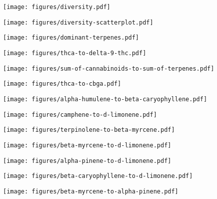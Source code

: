 \documentclass[../article.tex, 12pt]{subfiles}
\begin{document}
\begin{multicols}{2}
\vspace{1\baselineskip}

\texttt{[image: figures/diversity.pdf]}

\vspace{2\baselineskip}

\texttt{[image: figures/diversity-scatterplot.pdf]}

\vspace{2\baselineskip}

{\tiny
\vspace{1\baselineskip}

}

\texttt{[image: figures/dominant-terpenes.pdf]}


%
%


\texttt{[image: figures/thca-to-delta-9-thc.pdf]}

\vspace{2\baselineskip}

\texttt{[image: figures/sum-of-cannabinoids-to-sum-of-terpenes.pdf]}

\vspace{2\baselineskip}

\texttt{[image: figures/thca-to-cbga.pdf]}

\vspace{2\baselineskip}

\texttt{[image: figures/alpha-humulene-to-beta-caryophyllene.pdf]}

\vspace{2\baselineskip}

\texttt{[image: figures/camphene-to-d-limonene.pdf]}

\vspace{2\baselineskip}

\texttt{[image: figures/terpinolene-to-beta-myrcene.pdf]}

\vspace{2\baselineskip}

\texttt{[image: figures/beta-myrcene-to-d-limonene.pdf]}

\vspace{2\baselineskip}

\texttt{[image: figures/alpha-pinene-to-d-limonene.pdf]}

\vspace{2\baselineskip}

\texttt{[image: figures/beta-caryophyllene-to-d-limonene.pdf]}

\vspace{2\baselineskip}

\texttt{[image: figures/beta-myrcene-to-alpha-pinene.pdf]}

\end{multicols}
\end{document}

